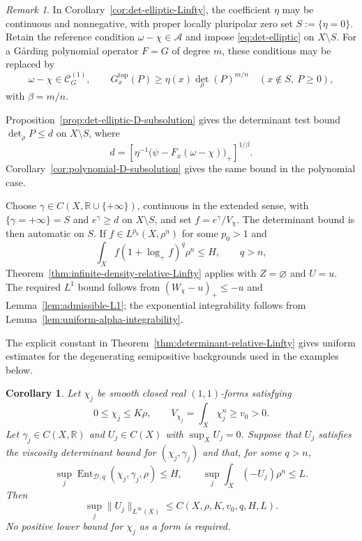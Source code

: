 \documentclass[oneside,english,letterpaper]{amsart}
\numberwithin{equation}{section}
\theoremstyle{plain}
\newtheorem{cor}[thm]{Corollary}
\theoremstyle{definition}
\theoremstyle{remark}
\newtheorem{rem}[thm]{Remark}
\begin{document}
\begin{rem}
\label{rem:det-elliptic-degenerate-eta}
In Corollary~\ref{cor:det-elliptic-Linfty}, the coefficient $\eta$
may be continuous and nonnegative, with proper locally pluripolar
zero set $S:=\{\eta=0\}$. Retain the reference condition
$\omega-\chi\in\mathcal A$ and impose \eqref{eq:det-elliptic}
on $X\setminus S$.
For a G{\aa}rding polynomial operator $F=G$ of degree $m$,
these conditions may be replaced by
\[
\omega-\chi\in\mathcal C_G^{(1)},\qquad
G_x^{\mathrm{top}}(P)\geq\eta(x)\det_\rho(P)^{m/n}
\quad(x\notin S,\ P\geq0),
\]
with $\beta=m/n$.

Proposition~\ref{prop:det-elliptic-D-subsolution} gives the
determinant test bound $\det_\rho P\leq d$ on $X\setminus S$, where
\[
d=\left[\eta^{-1}
\bigl(\psi-F_x(\omega-\chi)\bigr)_+\right]^{1/\beta}.
\]
Corollary~\ref{cor:polynomial-D-subsolution} gives the same bound
in the polynomial case.

Choose $\gamma\in C(X,\mathbb R\cup\{+\infty\})$, continuous
in the extended sense, with $\{\gamma=+\infty\}=S$ and
$e^\gamma\geq d$ on $X\setminus S$, and set $f=e^\gamma/V_\chi$.
The determinant bound is then automatic on $S$.
If $f\in L^{p_0}(X,\rho^n)$ for some $p_0>1$ and
\[
\int_X f(1+\log_+f)^q\rho^n\leq H,\qquad q>n,
\]
Theorem~\ref{thm:infinite-density-relative-Linfty} applies with
$Z=\varnothing$ and $U=u$.
The required $L^1$ bound follows from
$(W_\chi-u)_+\leq-u$ and Lemma~\ref{lem:admissible-L1};
the exponential integrability follows from
Lemma~\ref{lem:uniform-alpha-integrability}.
\end{rem}



The explicit constant in Theorem~\ref{thm:determinant-relative-Linfty}
gives uniform estimates for the degenerating semipositive
backgrounds used in the examples below.

\begin{cor}
	\label{cor:semipositive-uniform-Linfty}
	Let $\chi_j$ be smooth closed real $(1,1)$-forms satisfying
	$$
	0\leq\chi_j\leq K\rho,
	\qquad
	V_{\chi_j}=\int_X\chi_j^n\geq v_0>0.
	$$
	Let $\gamma_j\in C(X,\mathbb R)$ and $U_j\in C(X)$ with
	$\sup_XU_j=0$. Suppose that $U_j$ satisfies the viscosity
	determinant bound for $(\chi_j,\gamma_j)$ and that, for some $q>n$,
	$$
	\sup_j\operatorname{Ent}_{\mathcal D,q}(\chi_j,\gamma_j,\rho)\leq H,
	\qquad
	\sup_j\int_X(-U_j)\rho^n\leq L.
	$$
	Then
	$$
	\sup_j\|U_j\|_{L^\infty(X)}
	\leq C(X,\rho,K,v_0,q,H,L).
	$$
	No positive lower bound for $\chi_j$ as a form is required.
\end{cor}
\end{document}
